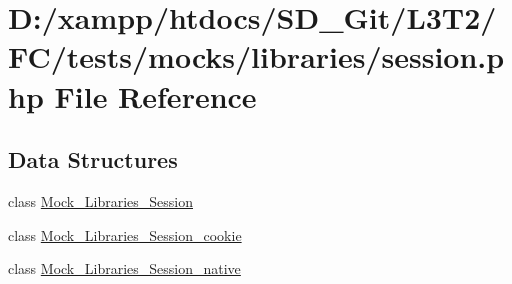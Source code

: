 \hypertarget{tests_2mocks_2libraries_2_session_8php}{}\section{D\+:/xampp/htdocs/\+S\+D\+\_\+\+Git/\+L3\+T2/\+F\+C/tests/mocks/libraries/session.php File Reference}
\label{tests_2mocks_2libraries_2_session_8php}
\subsection*{Data Structures}
\begin{DoxyCompactItemize}
\item 
class \hyperlink{class_mock___libraries___session}{Mock\+\_\+\+Libraries\+\_\+\+Session}
\item 
class \hyperlink{class_mock___libraries___session__cookie}{Mock\+\_\+\+Libraries\+\_\+\+Session\+\_\+cookie}
\item 
class \hyperlink{class_mock___libraries___session__native}{Mock\+\_\+\+Libraries\+\_\+\+Session\+\_\+native}
\end{DoxyCompactItemize}
